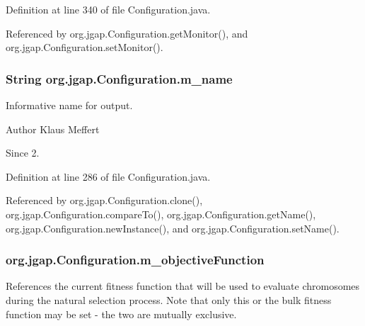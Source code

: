 Definition at line 340 of file Configuration.\-java.



Referenced by org.\-jgap.\-Configuration.\-get\-Monitor(), and org.\-jgap.\-Configuration.\-set\-Monitor().

\hypertarget{classorg_1_1jgap_1_1_configuration_a07c3f6ff3365065b052d914c9d3a4124}{
\subsubsection[{m\-\_\-name}]{\setlength{\rightskip}{0pt plus 5cm}String org.\-jgap.\-Configuration.\-m\-\_\-name\hspace{0.3cm}{\ttfamily [private]}}}\label{classorg_1_1jgap_1_1_configuration_a07c3f6ff3365065b052d914c9d3a4124}
Informative name for output.

\begin{DoxyAuthor}{Author}
Klaus Meffert 
\end{DoxyAuthor}
\begin{DoxySince}{Since}
2. 
\end{DoxySince}


Definition at line 286 of file Configuration.\-java.



Referenced by org.\-jgap.\-Configuration.\-clone(), org.\-jgap.\-Configuration.\-compare\-To(), org.\-jgap.\-Configuration.\-get\-Name(), org.\-jgap.\-Configuration.\-new\-Instance(), and org.\-jgap.\-Configuration.\-set\-Name().

\hypertarget{classorg_1_1jgap_1_1_configuration_ab2b072d0731e6f93e2fdb372f4ca03bf}{
\subsubsection[{m\-\_\-objective\-Function}]{ org.\-jgap.\-Configuration.\-m\-\_\-objective\-Function\hspace{0.3cm}{\ttfamily [private]}}}\label{classorg_1_1jgap_1_1_configuration_ab2b072d0731e6f93e2fdb372f4ca03bf}
References the current fitness function that will be used to evaluate chromosomes during the natural selection process. Note that only this or the bulk fitness function may be set -\/ the two are mutually exclusive.

